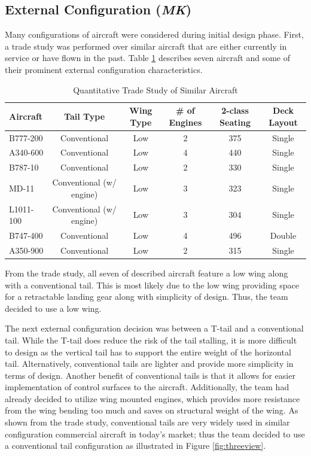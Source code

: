 \subsection{External Configuration  (\textit{MK})}
Many configurations of aircraft were considered during initial design phase. First, a trade study was performed over similar aircraft that are either currently in service or have flown in the past. Table \ref{tabmk1} describes seven aircraft and some of their prominent external configuration characteristics. 

\begin{table}[!h]
    \centering
    \caption{Quantitative Trade Study of Similar Aircraft}
    \begin{tabular}{|m{2cm}||c|c|c|c|c|}
    \toprule
    \label{tabmk1}
    \textbf{Aircraft} & \textbf{Tail Type} & \textbf{Wing Type} & \textbf{\# of Engines} & \textbf{2-class Seating} & \textbf{Deck Layout} \\
    \hline\hline
    B777-200 & Conventional & Low & 2 & 375 & Single \\ 
    \hline
    A340-600 & Conventional & Low & 4 & 440 & Single \\
    \hline
    B787-10 & Conventional & Low & 2 & 330 & Single \\
    \hline
    MD-11 & Conventional (w/ engine) & Low & 3 & 323 & Single \\
    \hline
    L1011-100 & Conventional (w/ engine) & Low & 3 & 304 & Single \\
    \hline
    B747-400 & Conventional & Low & 4 & 496 & Double \\
    \hline
    A350-900 & Conventional & Low & 2 & 315 & Single \\
    \bottomrule
    \end{tabular}
\end{table}

From the trade study, all seven of described aircraft feature a low wing along with a conventional tail. This is most likely due to the low wing providing space for a retractable landing gear along with simplicity of design. Thus, the team decided to use a low wing.

The next external configuration decision was between a T-tail and a conventional tail. While the T-tail does reduce the risk of the tail stalling, it is more difficult to design as the vertical tail has to support the entire weight of the horizontal tail. Alternatively, conventional tails are lighter and provide more simplicity in terms of design. Another benefit of conventional tails is that it allows for easier implementation of control surfaces to the aircraft. Additionally, the team had already decided to utilize wing mounted engines, which provides more resistance from the wing bending too much and saves on structural weight of the wing. As shown from the trade study, conventional tails are very widely used in similar configuration commercial aircraft in today's market; thus the team decided to use a conventional tail configuration as illustrated in Figure \ref{fig:threeview}.

